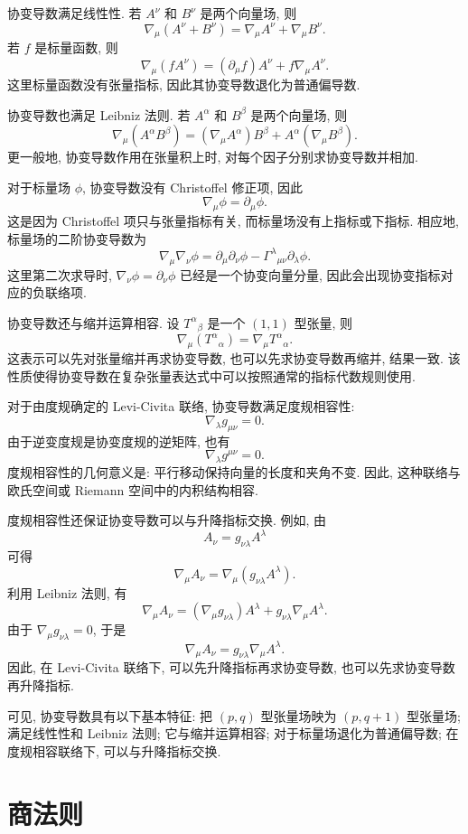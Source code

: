 协变导数满足线性性. 若 $A^{\nu}$ 和 $B^{\nu}$ 是两个向量场, 则
\[
\nabla_{\mu}(A^{\nu}+B^{\nu})
=
\nabla_{\mu}A^{\nu}
+
\nabla_{\mu}B^{\nu}.
\]
若 $f$ 是标量函数, 则
\[
\nabla_{\mu}(fA^{\nu})
=
(\partial_{\mu}f)A^{\nu}
+
f\nabla_{\mu}A^{\nu}.
\]
这里标量函数没有张量指标, 因此其协变导数退化为普通偏导数. 

协变导数也满足 Leibniz 法则. 若 $A^{\alpha}$ 和 $B^{\beta}$ 是两个向量场, 则
\[
\nabla_{\mu}(A^{\alpha}B^{\beta})
=
(\nabla_{\mu}A^{\alpha})B^{\beta}
+
A^{\alpha}(\nabla_{\mu}B^{\beta}).
\]
更一般地, 协变导数作用在张量积上时, 对每个因子分别求协变导数并相加. 

对于标量场 $\phi$, 协变导数没有 Christoffel 修正项, 因此
\[
\nabla_{\mu}\phi
=
\partial_{\mu}\phi.
\]
这是因为 Christoffel 项只与张量指标有关, 而标量场没有上指标或下指标. 相应地, 标量场的二阶协变导数为
\[
\nabla_{\mu}\nabla_{\nu}\phi
=
\partial_{\mu}\partial_{\nu}\phi
-
\Gamma^{\lambda}{}_{\mu\nu}\partial_{\lambda}\phi.
\]
这里第二次求导时, $\nabla_{\nu}\phi=\partial_{\nu}\phi$ 已经是一个协变向量分量, 因此会出现协变指标对应的负联络项. 

协变导数还与缩并运算相容. 设 $T^{\alpha}{}_{\beta}$ 是一个 $(1,1)$ 型张量, 则
\[
\nabla_{\mu}(T^{\alpha}{}_{\alpha})
=
\nabla_{\mu}T^{\alpha}{}_{\alpha}.
\]
这表示可以先对张量缩并再求协变导数, 也可以先求协变导数再缩并, 结果一致. 该性质使得协变导数在复杂张量表达式中可以按照通常的指标代数规则使用. 

对于由度规确定的 Levi-Civita 联络, 协变导数满足度规相容性: 
\[
\nabla_{\lambda}g_{\mu\nu}=0.
\]
由于逆变度规是协变度规的逆矩阵, 也有
\[
\nabla_{\lambda}g^{\mu\nu}=0.
\]
度规相容性的几何意义是: 平行移动保持向量的长度和夹角不变. 因此, 这种联络与欧氏空间或 Riemann 空间中的内积结构相容. 

度规相容性还保证协变导数可以与升降指标交换. 例如, 由
\[
A_{\nu}=g_{\nu\lambda}A^{\lambda}
\]
可得
\[
\nabla_{\mu}A_{\nu}
=
\nabla_{\mu}(g_{\nu\lambda}A^{\lambda}).
\]
利用 Leibniz 法则, 有
\[
\nabla_{\mu}A_{\nu}
=
(\nabla_{\mu}g_{\nu\lambda})A^{\lambda}
+
g_{\nu\lambda}\nabla_{\mu}A^{\lambda}.
\]
由于 $\nabla_{\mu}g_{\nu\lambda}=0$, 于是
\[
\nabla_{\mu}A_{\nu}
=
g_{\nu\lambda}\nabla_{\mu}A^{\lambda}.
\]
因此, 在 Levi-Civita 联络下, 可以先升降指标再求协变导数, 也可以先求协变导数再升降指标. 

可见, 协变导数具有以下基本特征: 把 $(p,q)$ 型张量场映为 $(p,q+1)$ 型张量场; 满足线性性和 Leibniz 法则; 它与缩并运算相容; 对于标量场退化为普通偏导数; 在度规相容联络下, 可以与升降指标交换. 

\section{商法则}

